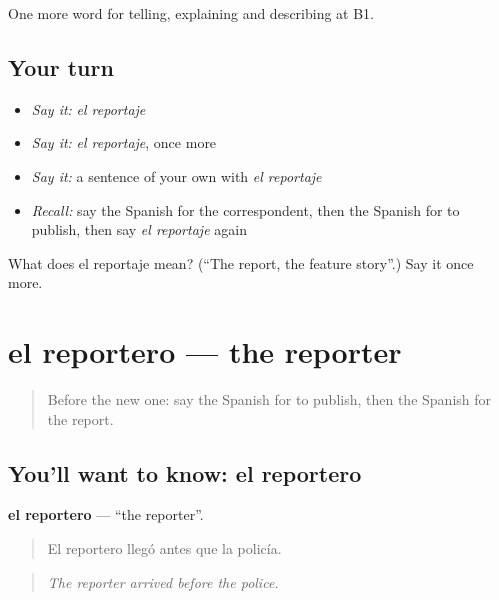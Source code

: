 \begin{grammarlens}[title={What you've built}]
One more word for telling, explaining and describing at B1.
\end{grammarlens}

\subsection*{Your turn}
\begin{itemize}
\raggedright
  \item \emph{Say it:} \emph{el reportaje}
  \item \emph{Say it:} \emph{el reportaje}, once more
  \item \emph{Say it:} a sentence of your own with \emph{el reportaje}
  \item \emph{Recall:} say the Spanish for the correspondent, then the Spanish for to publish, then say \emph{el reportaje} again
\end{itemize}

\begin{tcolorbox}[breakable,colback=teal!4,colframe=teal!35!black,title={Before you move on}]
What does el reportaje mean? (\textquotedblleft{}The report, the feature story\textquotedblright{}.) Say it once more.
\end{tcolorbox}
\section[el reportero]{el reportero — the reporter}

\label{lesson:ES-C514-reportero}



\begin{quote}
Before the new one: say the Spanish for to publish, then the Spanish for the report.
\end{quote}

\subsection*{You'll want to know: el reportero}
\textbf{el reportero} — \textquotedblleft{}the reporter\textquotedblright{}.

\begin{quote}
El reportero llegó antes que la policía.
\end{quote}

\begin{quote}
\emph{The reporter arrived before the police.}
\end{quote}


